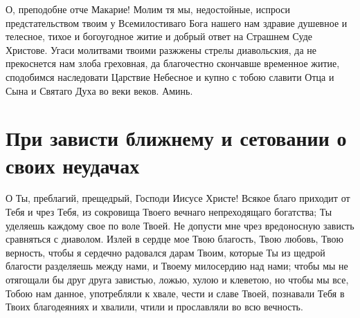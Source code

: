 

О, преподобне отче Макарие!  Молим тя мы, недостойные, испроси предстательством твоим у Всемилостиваго Бога нашего нам здравие душевное и телесное, тихое и богоугодное житие  и добрый ответ на Страшнем Суде Христове. Угаси молитвами твоими разжжены стрелы диавольския, да не прекоснется нам злоба греховная, да благочестно скончавше временное житие, сподобимся наследовати Царствие Небесное и купно с тобою славити Отца и Сына и Святаго Духа во веки веков. Аминь.
\mychapterending


 

\section{При зависти ближнему и сетовании о своих неудачах}
 


О Ты, преблагий, прещедрый, Господи Иисусе Христе! Всякое благо приходит от Тебя и чрез Тебя, из сокровища Твоего вечнаго непреходящаго богатства; Ты уделяешь каждому свое по воле Твоей. Не допусти мне чрез вредоносную зависть сравняться с диаволом. Излей в сердце мое Твою благость, Твою любовь, Твою верность, чтобы я сердечно радовался дарам Твоим, которые Ты из щедрой благости разделяешь между нами, и Твоему милосердию над нами; чтобы мы не отягощали бы друг друга завистью, ложью, хулою и клеветою, но чтобы мы все, Тобою нам данное, употребляли к хвале, чести и славе Твоей, познавали Тебя в Твоих благодеяниях и хвалили, чтили и прославляли во всю вечность.
\mychapterending

